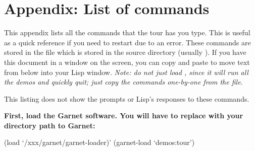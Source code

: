 \chapter*{Appendix: List of commands}
This appendix lists all the commands that the tour has you type.  This is
useful as a quick reference if you need to restart due to an error.
These commands are stored in
the file  which is stored in the  source
directory (usually ).
If you have this document in a window on the screen, you can
copy 
and 
paste to move text from below into your Lisp window.
{\it Note: do
not just load , since it will run all the demos and quickly
quit; just copy the commands one-by-one from the file}.

This listing does not show the prompts or Lisp's responses to these commands.

{\bf First, load the Garnet software.  You will have to replace 
with your directory path to Garnet:}
\begin{programexample}
(load `/xxx/garnet/garnet-loader)'
(garnet-load `demos:tour')
\end{programexample}


